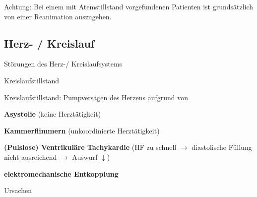 \documentclass{article}
\newcommand\gEs[1]{\textbf{\textcolor[rgb]{0.0,0.0,0.5019608}{#1}}}
\newcommand\gEs[1]{\textbf{\textcolor[rgb]{0.0,0.0,0.5019608}{#1}}}
\begin{document}
{\mdseries
Achtung: Bei einem mit Atemstillstand vorgefundenen Patienten ist
grunds\"atzlich von einer Reanimation auszugehen. }

\subsection[Herz- / Kreislauf]{Herz- / Kreislauf}
\label{bkm:RefHeading42514202}{\mdseries
St\"orungen des Herz-/ Kreislaufsystems}

{\mdseries\color[rgb]{0.0,0.0,0.5019608}
\label{bkm:RefHeading42514602}Kreislaufstillstand}

{\mdseries
Kreislaufstillstand: Pumpversagen des Herzens aufgrund von}

{\mdseries
\gEs{Asystolie} (keine Herzt\"atigkeit)}

{\mdseries
\gEs{Kammerflimmern} (unkoordinierte
Herzt\"atigkeit)}

{\mdseries
\gEs{(Pulslose) Ventrikul\"are Tachykardie} (HF zu
schnell ${\rightarrow}$ diastolische F\"ullung nicht ausreichend
${\rightarrow}$ Auswurf ${\downarrow}$)}

{\mdseries
\gEs{elektromechanische Entkopplung} }

{\mdseries\color{black}
Ursachen}
\end{document}
